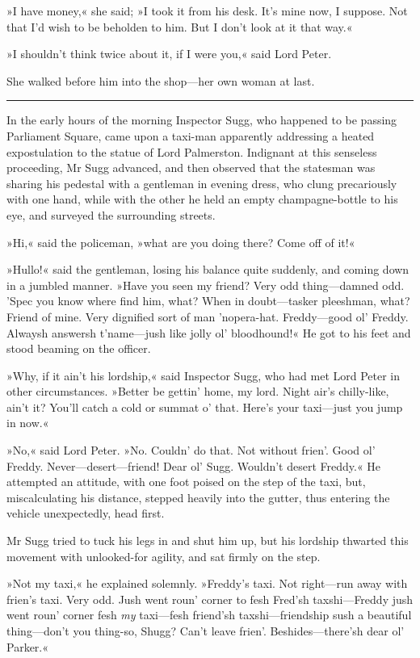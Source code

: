 »I have money,« she said; »I took it from his desk. It's mine now, I suppose. Not that I'd wish to be beholden to him. But I don't look at it that way.«

»I shouldn't think twice about it, if I were you,« said Lord Peter.

She walked before him into the shop—her own woman at last. 

\noindent\hfil\rule{0.5\textwidth}{.4pt}\hfil 

In the early hours of the morning Inspector Sugg, who happened to be passing Parliament Square, came upon a taxi-man apparently addressing a heated expostulation to the statue of Lord Palmerston. Indignant at this senseless proceeding, Mr Sugg advanced, and then observed that the statesman was sharing his pedestal with a gentleman in evening dress, who clung precariously with one hand, while with the other he held an empty champagne-bottle to his eye, and surveyed the surrounding streets.

»Hi,« said the policeman, »what are you doing there? Come off of it!«

»Hullo!« said the gentleman, losing his balance quite suddenly, and coming down in a jumbled manner. »Have you seen my friend? Very odd thing—damned odd. 'Spec you know where find him, what? When in doubt—tasker pleeshman, what? Friend of mine. Very dignified sort of man 'nopera-hat. Freddy—good ol' Freddy. Alwaysh answersh t'name—jush like jolly ol' bloodhound!« He got to his feet and stood beaming on the officer.

»Why, if it ain't his lordship,« said Inspector Sugg, who had met Lord Peter in other circumstances. »Better be gettin' home, my lord. Night air's chilly-like, ain't it? You'll catch a cold or summat o' that.  Here's your taxi—just you jump in now.«

»No,« said Lord Peter. »No. Couldn' do that. Not without frien'. Good ol' Freddy. Never—desert—friend! Dear ol' Sugg. Wouldn't desert Freddy.« He attempted an attitude, with one foot poised on the step of the taxi, but, miscalculating his distance, stepped heavily into the gutter, thus entering the vehicle unexpectedly, head first.

Mr Sugg tried to tuck his legs in and shut him up, but his lordship thwarted this movement with unlooked-for agility, and sat firmly on the step.

»Not my taxi,« he explained solemnly. »Freddy's taxi. Not right—run away with frien's taxi. Very odd. Jush went roun' corner to fesh Fred'sh taxshi—Freddy jush went roun' corner fesh \textit{my} taxi—fesh friend'sh taxshi—friendship sush a beautiful thing—don't you thing-so, Shugg? Can't leave frien'. Beshides—there'sh dear ol' Parker.«

